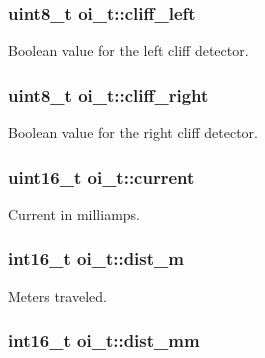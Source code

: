 \hypertarget{structoi__t_ae6bc5aecd8f52076a0cf10f39ac0e508}{
\subsubsection[{cliff\_\-left}]{\setlength{\rightskip}{0pt plus 5cm}uint8\_\-t {\bf oi\_\-t::cliff\_\-left}}}
\label{structoi__t_ae6bc5aecd8f52076a0cf10f39ac0e508}


Boolean value for the left cliff detector. 

\hypertarget{structoi__t_aaeb3aa5ab8fe93603d8b61425e1b20a0}{
\subsubsection[{cliff\_\-right}]{\setlength{\rightskip}{0pt plus 5cm}uint8\_\-t {\bf oi\_\-t::cliff\_\-right}}}
\label{structoi__t_aaeb3aa5ab8fe93603d8b61425e1b20a0}


Boolean value for the right cliff detector. 

\hypertarget{structoi__t_a4f77c70d4bd463033f985bfaceb7c138}{
\subsubsection[{current}]{\setlength{\rightskip}{0pt plus 5cm}uint16\_\-t {\bf oi\_\-t::current}}}
\label{structoi__t_a4f77c70d4bd463033f985bfaceb7c138}


Current in milliamps. 

\hypertarget{structoi__t_a04e77f3cefe5701cb98b7a783ac63b72}{
\subsubsection[{dist\_\-m}]{\setlength{\rightskip}{0pt plus 5cm}int16\_\-t {\bf oi\_\-t::dist\_\-m}}}
\label{structoi__t_a04e77f3cefe5701cb98b7a783ac63b72}


Meters traveled. 

\hypertarget{structoi__t_aa98fddc94e23d713ecaa8f9f4db9454c}{
\subsubsection[{dist\_\-mm}]{\setlength{\rightskip}{0pt plus 5cm}int16\_\-t {\bf oi\_\-t::dist\_\-mm}}}
\label{structoi__t_aa98fddc94e23d713ecaa8f9f4db9454c}


